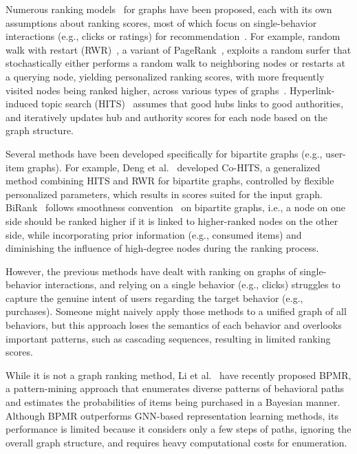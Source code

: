 Numerous ranking models~\cite{PanPYFD04,KleinbergK99,DengDLK09kqpg,HeHGKW17,MaMGZ08,BrinB98,HaveliwalaH02} for graphs have been proposed, each with its own assumptions about ranking scores, most of which focus on single-behavior interactions (e.g., clicks or ratings) for recommendation~\cite{GoriGP07,ParkPJK17,HeHGKW17,NikolakopoulosNK19,TianJ13}.
%
For example, random walk with restart (RWR)~\cite{PanPYFD04, MaMGZ08,ShinJSK15,JungPSK17,LeeLJ22}, a variant of PageRank~\cite{BrinB98}, exploits a random surfer that stochastically either performs a random walk to neighboring nodes or restarts at a querying node, yielding personalized ranking scores, with more frequently visited nodes being ranked higher, across various types of graphs~\cite{JungJJSK16,JungJPK21,ChunLSJ24}.
Hyperlink-induced topic search (HITS)~\cite{KleinbergK99} assumes that good hubs links to good authorities, and iteratively updates hub and authority scores for each node based on the graph structure. 

Several methods have been developed specifically for bipartite graphs (e.g., user-item graphs).
For example, Deng et al.~\cite{DengDLK09kqpg} developed Co-HITS, a generalized method combining HITS and RWR for bipartite graphs, controlled by flexible personalized parameters, which results in scores suited for the input graph.
BiRank~\cite{HeHGKW17} follows smoothness convention~\cite{ZhouZBLWS03,AgarwalA06} on bipartite graphs, i.e., a node on one side should be ranked higher if it is linked to higher-ranked nodes on the other side, while incorporating prior information (e.g., consumed items) and diminishing the influence of high-degree nodes during the ranking process.

However, the previous methods have dealt with ranking on graphs of single-behavior interactions, and relying on a single behavior (e.g., clicks) struggles to capture the genuine intent of users regarding the target behavior (e.g., purchases).
Someone might naively apply those methods to a unified graph of all behaviors, but this approach loses the semantics of each behavior and overlooks important patterns, such as cascading sequences, resulting in limited ranking scores.

While it is not a graph ranking method, Li et al.~\cite{LiLCYLLD24} have recently proposed BPMR, a pattern-mining approach that enumerates diverse patterns of behavioral paths and estimates the probabilities of items being purchased in a Bayesian manner.
Although BPMR outperforms GNN-based representation learning methods, its performance is limited because it considers only a few steps of paths, ignoring the overall graph structure, and requires heavy computational costs for enumeration.